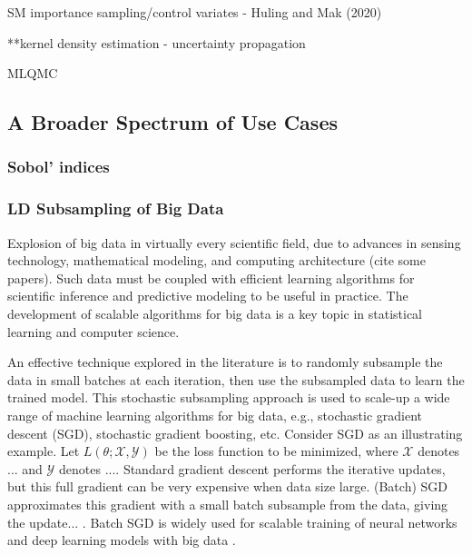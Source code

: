 \documentclass[11pt]{NSFamsart}
\begin{document}
SM importance sampling/control variates
- Huling and Mak (2020)

**kernel density estimation
- uncertainty propagation

MLQMC

\subsection{A Broader Spectrum of Use Cases}

\subsubsection{Sobol' indices}

\subsubsection{LD Subsampling of Big Data}

Explosion of big data in virtually every scientific field, due to advances in sensing technology, mathematical modeling, and computing architecture (cite some papers). Such data must be coupled with efficient learning algorithms for scientific inference and predictive modeling to be useful in practice. The development of scalable algorithms for big data is a key topic in statistical learning and computer science.

An effective technique explored in the literature is to randomly subsample the data in small batches at each iteration, then use the subsampled data to learn the trained model. This stochastic subsampling approach is used to scale-up a wide range of machine learning algorithms for big data, e.g., stochastic gradient descent (SGD), stochastic gradient boosting, etc. Consider SGD as an illustrating example. Let $L(\theta;\mathcal{X},\mathcal{Y})$ be the loss function to be minimized, where $\mathcal{X}$ denotes ... and $\mathcal{Y}$ denotes .... Standard gradient descent performs the iterative updates, but this full gradient can be very expensive when data size large. (Batch) SGD approximates this gradient with a small batch subsample from the data, giving the update... . Batch SGD is widely used for scalable training of neural networks and deep learning models with big data \citep{srivastava2014dropout}.
\end{document}
